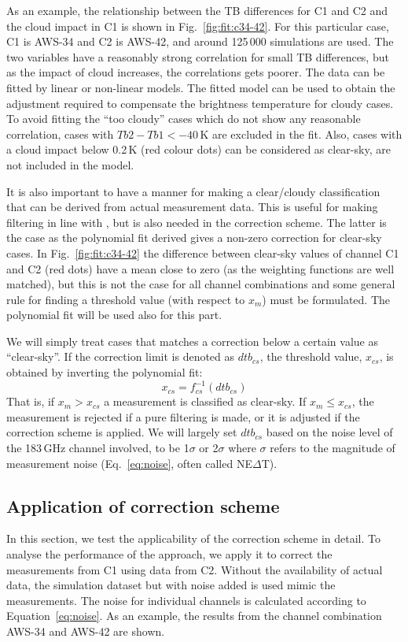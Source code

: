 \documentclass[12pt]{article}
\begin{document}
As an example, the relationship between the TB differences for C1 and C2 and
the cloud impact in C1 is shown in Fig.~\ref{fig:fit:c34-42}. For this
particular case, C1 is AWS-34 and C2 is AWS-42, and around 125\,000 simulations
are used. The two variables have a reasonably strong correlation for small TB
differences, but as the impact of cloud increases, the correlations gets
poorer. The data can be fitted by linear or non-linear models. The fitted model
can be used to obtain the adjustment required to compensate the brightness
temperature for cloudy cases. To avoid fitting the ``too cloudy'' cases which
do not show any reasonable correlation, cases with $Tb2-Tb1< -40$\,K are
excluded in the fit. Also, cases with a cloud impact below 0.2\,K (red colour
dots) can be considered as clear-sky, are not included in the model.

It is also important to have a manner for making a clear/cloudy classification
that can be derived from actual measurement data. This is useful for making
filtering in line with \citet{rekha2012potential}, but is also needed in the
correction scheme. The latter is the case as the polynomial fit derived gives a
non-zero correction for clear-sky cases. In Fig.~\ref{fig:fit:c34-42} the
difference between clear-sky values of channel C1 and C2 (red dots) have a mean
close to zero (as the weighting functions are well matched), but this is not
the case for all channel combinations and some general rule for finding a
threshold value (with respect to $x_m$) must be formulated. The polynomial fit
will be used also for this part.

We will simply treat cases that matches a correction below a certain value as
``clear-sky''. If the correction limit is denoted as $dtb_{cs}$, the threshold
value, $x_{cs}$, is obtained by inverting the polynomial fit:
\begin{equation}
x_{cs} = f_{cs}^{-1}(dtb_{cs}) 
\label{eq:dtb}
\end{equation}
That is, if $x_m>x_{cs}$ a measurement is classified as clear-sky. If
$x_m\leq x_{cs}$, the measurement is rejected if a pure filtering is made, or
it is adjusted if the correction scheme is applied. We will largely set
$dtb_{cs}$ based on the noise level of the 183\,GHz channel involved, to be
1$\sigma$ or 2$\sigma$ where $\sigma$ refers to the magnitude of measurement
noise (Eq.~\ref{eq:noise}, often called NE$\Delta$T).



\subsection{Application of correction scheme}
%
In this section, we test the applicability of the correction scheme in detail.
To analyse the performance of the approach, we apply it to correct the
measurements from C1 using data from C2. Without the availability of actual
data, the simulation dataset but with noise added is used mimic the measurements. The
noise for individual channels is calculated according to
Equation~\ref{eq:noise}. As an example, the results from the channel
combination AWS-34 and AWS-42 are shown.
\end{document}

